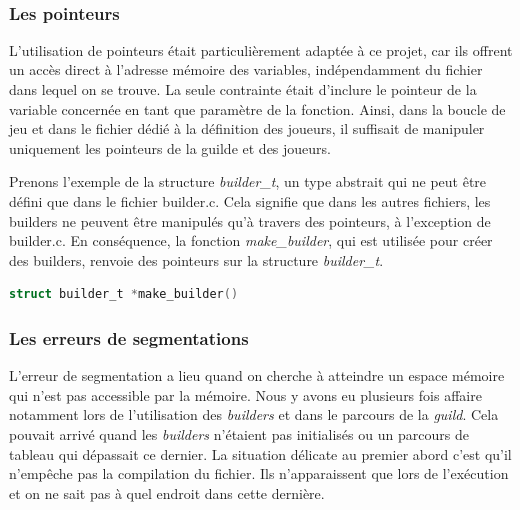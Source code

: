 \documentclass{article}
\begin{document}
\

\subsubsection{Les pointeurs}
\vspace{1em}
\hspace{1em}L'utilisation de pointeurs était particulièrement adaptée à ce projet, car ils offrent un accès direct à l'adresse mémoire des variables, indépendamment du fichier dans lequel on se trouve. La seule contrainte était d'inclure le pointeur de la variable concernée en tant que paramètre de la fonction. Ainsi, dans la boucle de jeu et dans le fichier dédié à la définition des joueurs, il suffisait de manipuler uniquement les pointeurs de la guilde et des joueurs.

Prenons l'exemple de la structure \emph{builder\_t}, un type abstrait qui ne peut être défini que dans le fichier builder.c. Cela signifie que dans les autres fichiers, les builders ne peuvent être manipulés qu'à travers des pointeurs, à l'exception de builder.c. En conséquence, la fonction \emph{make\_builder}, qui est utilisée pour créer des builders, renvoie des pointeurs sur la structure \emph{builder\_t}.

\begin{tcolorbox}[colback=gray!10,colframe=white!75!black]
\begin{lstlisting}[language=C, caption={La fonction \text{make\_builder}},label={lst:exemple0-c}]
struct builder_t *make_builder() 
\end{lstlisting}
\end{tcolorbox}


\subsubsection{Les erreurs de segmentations}

\hspace{1em} L'erreur de segmentation a lieu quand on cherche à atteindre un espace mémoire qui n'est pas accessible par la mémoire. Nous y avons eu plusieurs fois affaire notamment lors de l'utilisation des \emph{builders} et dans le parcours de la \emph{guild}. Cela pouvait arrivé quand les \emph{builders} n'étaient pas initialisés ou un parcours de tableau qui dépassait ce dernier. La situation délicate au premier abord c'est qu'il n'empêche pas la compilation du fichier. Ils n'apparaissent que lors de l'exécution et on ne sait pas à quel endroit  dans cette dernière. 
\end{document}

